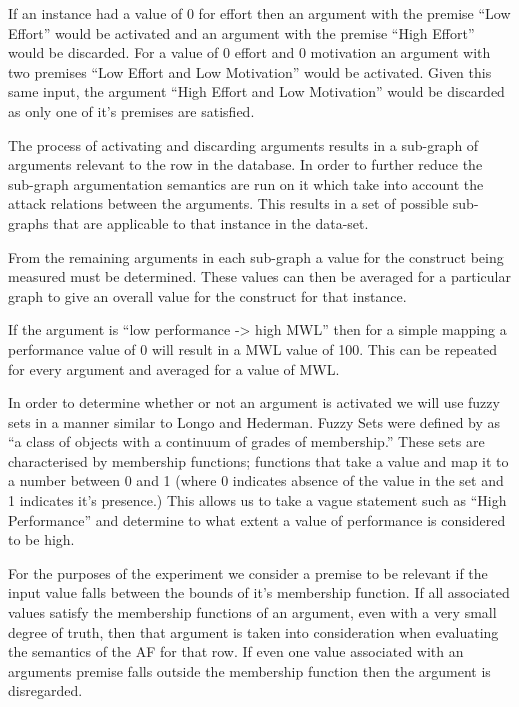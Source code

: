 \begin{exmp}
If an instance had a value of 0 for effort then an argument with the premise ``Low Effort'' would be activated and an argument with the premise ``High Effort'' would be discarded. For a value of 0 effort and 0 motivation an argument with two premises ``Low Effort and Low Motivation'' would be activated. Given this same input, the argument ``High Effort and Low Motivation'' would be discarded as only one of it's premises are satisfied.
\end{exmp}

The process of activating and discarding arguments results in a sub-graph of arguments relevant to the row in the database. In order to further reduce the sub-graph argumentation semantics are run on it which take into account the attack relations between the arguments. This results in a set of possible sub-graphs that are applicable to that instance in the data-set.

From the remaining arguments in each sub-graph a value for the construct being measured must be determined. These values can then be averaged for a particular graph to give an overall value for the construct for that instance. 

\begin{exmp}
If the argument is ``low performance -> high MWL'' then for a simple mapping a performance value of 0 will result in a MWL value of 100. This can be repeated for every argument and averaged for a value of MWL.
\end{exmp}

In order to determine whether or not an argument is activated we will use fuzzy sets in a manner similar to Longo and Hederman. Fuzzy Sets were defined by \cite{zadeh1965fuzzy} as ``a class of objects with a continuum of grades of membership.'' These sets are characterised by membership functions; functions that take a value and map it to a number between 0 and 1 (where 0 indicates absence of the value in the set and 1 indicates it's presence.) This allows us to take a vague statement such as ``High Performance'' and determine to what extent a value of performance is considered to be high. 

For the purposes of the experiment we consider a premise to be relevant if the input value falls between the bounds of it's membership function. If all associated values satisfy the membership functions of an argument, even with a very small degree of truth, then that argument is taken into consideration when evaluating the semantics of the AF for that row. If even one value associated with an arguments premise falls outside the membership function then the argument is disregarded.

